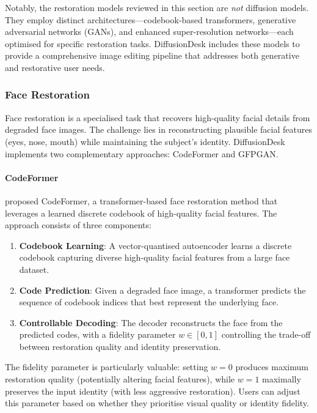 \documentclass[12pt,a4paper]{report}
\begin{document}
Notably, the restoration models reviewed in this section are \textit{not} diffusion models. They employ distinct architectures---codebook-based transformers, generative adversarial networks (GANs), and enhanced super-resolution networks---each optimised for specific restoration tasks. DiffusionDesk includes these models to provide a comprehensive image editing pipeline that addresses both generative and restorative user needs.

\subsubsection{Face Restoration}

Face restoration is a specialised task that recovers high-quality facial details from degraded face images. The challenge lies in reconstructing plausible facial features (eyes, nose, mouth) while maintaining the subject's identity. DiffusionDesk implements two complementary approaches: CodeFormer and GFPGAN.

\paragraph{CodeFormer}

\citet{zhou2022codeformer} proposed CodeFormer, a transformer-based face restoration method that leverages a learned discrete codebook of high-quality facial features. The approach consists of three components:

\begin{enumerate}
    \item \textbf{Codebook Learning}: A vector-quantised autoencoder learns a discrete codebook capturing diverse high-quality facial features from a large face dataset.
    \item \textbf{Code Prediction}: Given a degraded face image, a transformer predicts the sequence of codebook indices that best represent the underlying face.
    \item \textbf{Controllable Decoding}: The decoder reconstructs the face from the predicted codes, with a fidelity parameter $w \in [0, 1]$ controlling the trade-off between restoration quality and identity preservation.
\end{enumerate}

The fidelity parameter is particularly valuable: setting $w = 0$ produces maximum restoration quality (potentially altering facial features), while $w = 1$ maximally preserves the input identity (with less aggressive restoration). Users can adjust this parameter based on whether they prioritise visual quality or identity fidelity.
\end{document}
